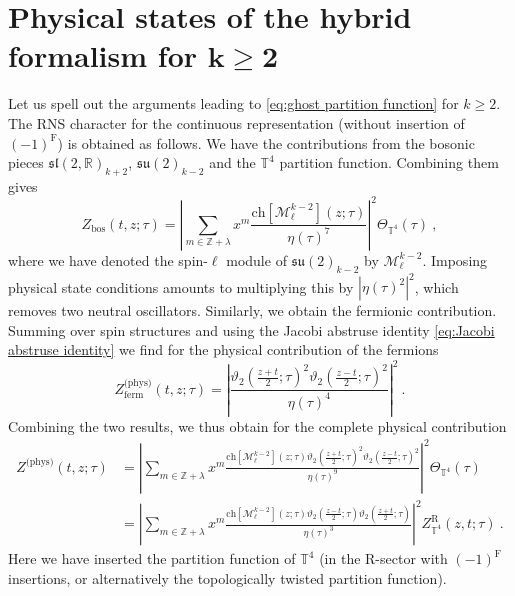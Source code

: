 \documentclass[12pt,a4paper]{article}
\newcommand{\be}{\begin{equation}}
\newcommand{\ee}{\end{equation}}
\begin{document}

\section{Physical states of the hybrid formalism for $\boldsymbol{k \ge 2}$} \label{app:physical state conditions}
Let us spell out the arguments leading to \eqref{eq:ghost partition function} for $k \ge 2$. The RNS character for the continuous representation (without insertion of $(-1)^{\mathrm{F}}$) is obtained as follows. We have the contributions from the bosonic pieces $\mathfrak{sl}(2,\mathds{R})_{k+2}$, $\mathfrak{su}(2)_{k-2}$ and the $\mathbb{T}^4$ partition function. Combining them gives
\be 
Z_\text{bos}(t,z;\tau)=\left|\sum_{m \in \mathds{Z}+\lambda} x^m \frac{\mathrm{ch}[\mathscr{M}_\ell^{k-2}](z;\tau)}{\eta(\tau)^7}\right|^2 \Theta_{\mathbb{T}^4}(\tau)\ ,
\ee
where we have denoted the spin-$\ell$ module of $\mathfrak{su}(2)_{k-2}$ by $\mathscr{M}^{k-2}_\ell$.
Imposing physical state conditions amounts to multiplying this by $\left|\eta(\tau)^2\right|^2$, which removes two neutral oscillators. Similarly, we obtain the fermionic contribution. Summing over spin structures and using the Jacobi abstruse identity \eqref{eq:Jacobi abstruse identity} we find for the physical contribution of the fermions
\be 
Z_\text{ferm}^\text{(phys)}(t,z;\tau)=\left| \frac{\vartheta_2(\frac{z+t}{2};\tau)^2 \vartheta_2(\frac{z-t}{2};\tau)^2}{\eta(\tau)^4}\right|^2\ .
\ee
Combining the two results, we thus obtain for the complete physical contribution
\begin{align} 
Z^{\text{(phys)}}(t,z;\tau)&=\left|\sum_{m \in \mathds{Z}+\lambda} x^m \frac{\mathrm{ch}[\mathscr{M}_\ell^{k-2}](z;\tau)\vartheta_2(\frac{z+t}{2};\tau)^2 \vartheta_2(\frac{z-t}{2};\tau)^2}{\eta(\tau)^9}\right|^2 \Theta_{\mathbb{T}^4}(\tau)\\
&=\left|\sum_{m \in \mathds{Z}+\lambda} x^m \frac{\mathrm{ch}[\mathscr{M}_\ell^{k-2}](z;\tau)\vartheta_2(\frac{z-t}{2};\tau)\vartheta_2(\frac{z+t}{2};\tau)}{\eta(\tau)^3}\right|^2 Z_{\mathbb{T}^4}^\text{R}(z,t;\tau) \ . \label{eq:RNS formalism physical contribution}
\end{align}
Here we have inserted the partition function of $\mathbb{T}^4$ (in the R-sector with $(-1)^\mathrm{F}$ insertions, or alternatively the topologically twisted partition function).
\end{document}
